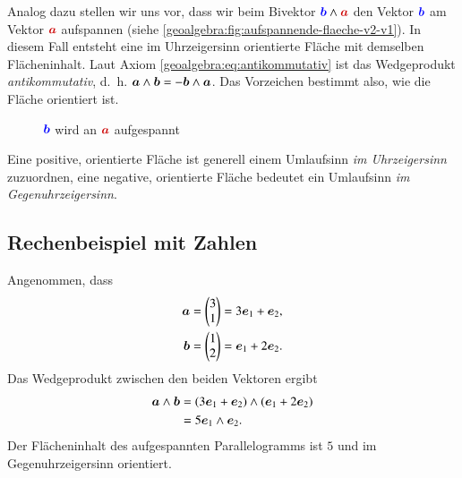 Analog dazu stellen wir uns vor, dass wir beim Bivektor $\bcolored \wedge \acolored$ den Vektor
$\bcolored$ am Vektor $\acolored$ aufspannen (siehe \autoref{geoalgebra:fig:aufspannende-flaeche-v2-v1}).
In diesem Fall entsteht eine im Uhrzeigersinn orientierte Fläche mit demselben
Flächeninhalt. Laut Axiom \eqref{geoalgebra:eq:antikommutativ} ist das Wedgeprodukt
\emph{antikommutativ}, d.~h. $\a \wedge \b = -\b \wedge \a$. Das Vorzeichen bestimmt also,
%
wie die Fläche orientiert ist.

\begin{figure}
\begin{center}


\end{center}
  \caption{$\bcolored$ wird an $\acolored$ aufgespannt}\label{geoalgebra:fig:aufspannende-flaeche-v2-v1}
\end{figure}

Eine positive, orientierte Fläche ist generell einem Umlaufsinn \emph{im Uhrzeigersinn}
%
zuzuordnen, eine negative, orientierte Fläche bedeutet ein Umlaufsinn \emph{im Gegenuhrzeigersinn}.


\subsection{Rechenbeispiel mit Zahlen}
\label{geoalgebra:section:example}

Angenommen, dass 
\begin{align*}
    \boldsymbol{a} &= \begin{pmatrix} 3 \\ 1 \end{pmatrix} = 3 \eone + \etwo, \\
    \boldsymbol{b} &= \begin{pmatrix} 1 \\ 2 \end{pmatrix} = \eone + 2 \etwo.
\end{align*}
Das Wedgeprodukt zwischen den beiden Vektoren ergibt
\begin{align}
    \boldsymbol{a} \wedge \boldsymbol{b} &= (3 \eone + \etwo) \wedge (\eone + 2 \etwo)
\notag
\\
    &= 5 \eone \wedge \etwo.
\label{geoalgebra:bivektor:beispiel}
\end{align}
Der Flächeninhalt des aufgespannten Parallelogramms ist $5$ und im Gegenuhrzeigersinn orientiert.

